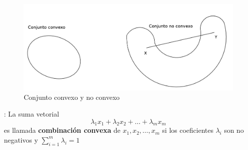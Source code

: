 \begin{figure}[h]
   \centering
   \includegraphics[scale=0.8]{./partes/convexo.jpg}
   \caption{Conjunto convexo y no convexo}
   \label{cyn}
\end{figure}


{: La suma vetorial \cite{no-lineal} 
$$\lambda_1 x_1 + \lambda_2 x_2 + \ldots + \lambda_m x_m$$
es llamada {\bf combinaci\'on convexa} de $x_1, x_2, \ldots , x_m$ si los coeficientes $\lambda_i$
son no negativos y $\displaystyle \sum_{i=1}^{m} \lambda_i = 1$  \label{def2} }\\ \\

